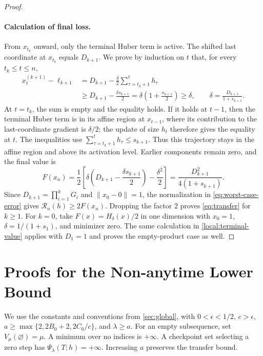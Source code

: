 \documentclass[11pt,letterpaper]{article}
\theoremstyle{definition}
\begin{document}
\begin{proof}
\paragraph{Calculation of final loss.}
From $x_{t_k}$ onward, only the terminal Huber term is active.
The shifted last coordinate at $x_{t_k}$ equals $D_{k+1}$.
We prove by induction on $t$ that, for every $t_k\le t\le n$,
\[
\begin{aligned}
  x_t^{(k+1)}-\ell_{k+1}
  &=D_{k+1}-\frac{\delta}{2}\sum_{\tau=t_k+1}^{t}h_\tau\\
  &\ge D_{k+1}-\frac{\delta s_{k+1}}2
   =\delta\left(1+\frac{s_{k+1}}2\right)\ge\delta,
  \qquad \delta=\frac{D_{k+1}}{1+s_{k+1}}.
\end{aligned}
\]
At $t=t_k$, the sum is empty and the equality holds.
If it holds at $t-1$, then the terminal Huber term is in its affine region at
$x_{t-1}$, where its contribution to the last-coordinate gradient is
$\delta/2$; the update of size $h_t$ therefore gives the equality at $t$.
The inequalities use
$\sum_{\tau=t_k+1}^{t}h_\tau\le s_{k+1}$.
Thus this trajectory stays in the affine region and above its activation level.
Earlier components remain zero, and the final value is
\begin{equation}
  F(x_n)=\frac12\left[\delta\left(D_{k+1}-\frac{\delta s_{k+1}}{2}\right)
                             -\frac{\delta^2}{2}\right]
        =\frac{D_{k+1}^2}{4(1+s_{k+1})}.
  \label{local:terminal-value}
\end{equation}
Since $D_{k+1}=\prod_{i=1}^kG_i$ and $\|x_0-0\|=1$, the normalization in \eqref{eq:worst-case-error} gives $\mathcal R_n(h)\ge2F(x_n)$.
Dropping the factor $2$ proves \eqref{eq:transfer} for $k\ge1$.
For $k=0$, take $F(x)=H_\delta(x)/2$ in one dimension with
$x_0=1$, $\delta=1/(1+s_1)$, and minimizer zero.
The same calculation in \eqref{local:terminal-value} applies with $D_1=1$ and
proves the empty-product case as well.
\end{proof}

\section{Proofs for the Non-anytime Lower Bound}
\label{app:global}

We use the constants and conventions from \cref{sec:global}, with $0<\epsilon<1/2$, $c>\epsilon$, $a\ge\max\{2,2B_0+2,2C_0/c\}$, and $\lambda\ge a$.
For an empty subsequence, set $V_\mu(\varnothing)=\mu$.
A minimum over no indices is $+\infty$.
A checkpoint set selecting a zero step has $\Psi_\lambda(T;h)=+\infty$.
Increasing $a$ preserves the transfer bound.
\end{document}
